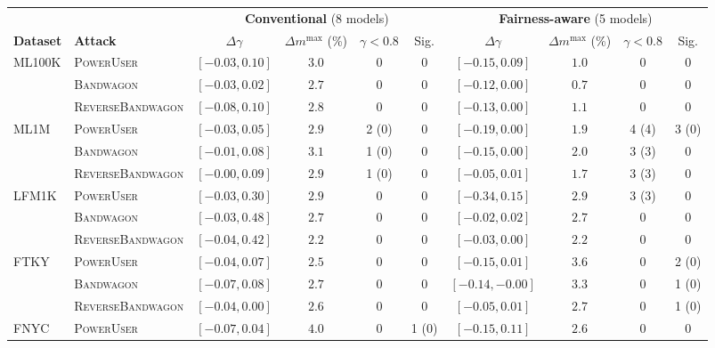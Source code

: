\begin{table}
\begin{adjustbox}{max width=\textwidth}
\centering
\begin{tabular}{l l cccc cccc}
\toprule
 & & \multicolumn{4}{c}{\textbf{Conventional} (8 models)} & \multicolumn{4}{c}{\textbf{Fairness-aware} (5 models)} \\
\cmidrule(lr){3-6}\cmidrule(lr){7-10}
\textbf{Dataset} & \textbf{Attack} & $\Delta\gamma$ & $\Delta m^{\max}$ (\%) & $\gamma<0.8$ & Sig. & $\Delta\gamma$ & $\Delta m^{\max}$ (\%) & $\gamma<0.8$ & Sig. \\
\midrule
\multirow{3}{*}{ML100K} & \textsc{PowerUser} & $[-0.03, 0.10]$ & $3.0$ & 0 & 0 & $[-0.15, 0.09]$ & $1.0$ & 0 & 0 \\
& \textsc{Bandwagon} & $[-0.03, 0.02]$ & $2.7$ & 0 & 0 & $[-0.12, 0.00]$ & $0.7$ & 0 & 0 \\
& \textsc{ReverseBandwagon} & $[-0.08, 0.10]$ & $2.8$ & 0 & 0 & $[-0.13, 0.00]$ & $1.1$ & 0 & 0 \\
\cmidrule(lr){1-10}
\multirow{3}{*}{ML1M} & \textsc{PowerUser} & $[-0.03, 0.05]$ & $2.9$ & 2 (0) & 0 & $[-0.19, 0.00]$ & $1.9$ & 4 (4) & 3 (0) \\
& \textsc{Bandwagon} & $[-0.01, 0.08]$ & $3.1$ & 1 (0) & 0 & $[-0.15, 0.00]$ & $2.0$ & 3 (3) & 0 \\
& \textsc{ReverseBandwagon} & $[-0.00, 0.09]$ & $2.9$ & 1 (0) & 0 & $[-0.05, 0.01]$ & $1.7$ & 3 (3) & 0 \\
\cmidrule(lr){1-10}
\multirow{3}{*}{LFM1K} & \textsc{PowerUser} & $[-0.03, 0.30]$ & $2.9$ & 0 & 0 & $[-0.34, 0.15]$ & $2.9$ & 3 (3) & 0 \\
& \textsc{Bandwagon} & $[-0.03, 0.48]$ & $2.7$ & 0 & 0 & $[-0.02, 0.02]$ & $2.7$ & 0 & 0 \\
& \textsc{ReverseBandwagon} & $[-0.04, 0.42]$ & $2.2$ & 0 & 0 & $[-0.03, 0.00]$ & $2.2$ & 0 & 0 \\
\cmidrule(lr){1-10}
\multirow{3}{*}{FTKY} & \textsc{PowerUser} & $[-0.04, 0.07]$ & $2.5$ & 0 & 0 & $[-0.15, 0.01]$ & $3.6$ & 0 & 2 (0) \\
& \textsc{Bandwagon} & $[-0.07, 0.08]$ & $2.7$ & 0 & 0 & $[-0.14, -0.00]$ & $3.3$ & 0 & 1 (0) \\
& \textsc{ReverseBandwagon} & $[-0.04, 0.00]$ & $2.6$ & 0 & 0 & $[-0.05, 0.01]$ & $2.7$ & 0 & 1 (0) \\
\cmidrule(lr){1-10}
\multirow{3}{*}{FNYC} & \textsc{PowerUser} & $[-0.07, 0.04]$ & $4.0$ & 0 & 1 (0) & $[-0.15, 0.11]$ & $2.6$ & 0 & 0 \\

\end{tabular}
\end{adjustbox}
\end{table}
